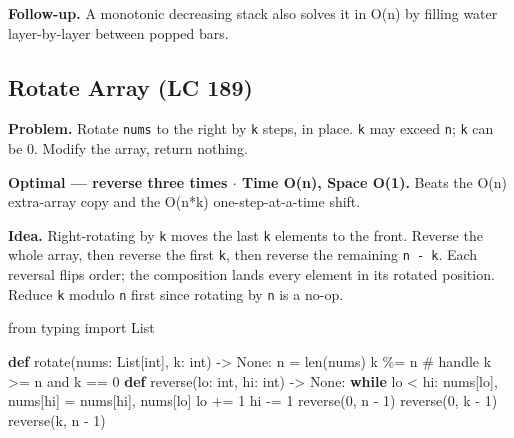 \documentclass[11pt]{article}
\newenvironment{Shaded}{\begin{snugshade}}{\end{snugshade}}
\newcommand{\BuiltInTok}[1]{\textcolor[rgb]{0.50,0.55,0.55}{#1}}
\newcommand{\CommentTok}[1]{\textcolor[rgb]{0.48,0.49,0.49}{#1}}
\newcommand{\ControlFlowTok}[1]{\textcolor[rgb]{0.99,0.74,0.29}{\textbf{#1}}}
\newcommand{\DecValTok}[1]{\textcolor[rgb]{0.96,0.45,0.00}{#1}}
\newcommand{\ImportTok}[1]{\textcolor[rgb]{0.15,0.68,0.38}{#1}}
\newcommand{\KeywordTok}[1]{\textcolor[rgb]{0.81,0.81,0.76}{\textbf{#1}}}
\newcommand{\NormalTok}[1]{\textcolor[rgb]{0.81,0.81,0.76}{#1}}
\newcommand{\OperatorTok}[1]{\textcolor[rgb]{0.81,0.81,0.76}{#1}}
\newcommand{\VariableTok}[1]{\textcolor[rgb]{0.15,0.68,0.68}{#1}}
\begin{document}
\textbf{Follow-up.} A monotonic decreasing stack also solves it in O(n) by filling water layer-by-layer between popped bars.

\subsection{Rotate Array (LC 189)}\label{rotate-array-lc-189}

\textbf{Problem.} Rotate \texttt{nums} to the right by \texttt{k} steps, in place. \texttt{k} may exceed \texttt{n}; \texttt{k} can be 0. Modify the array, return nothing.

\textbf{Optimal --- reverse three times \(\cdot\) Time O(n), Space O(1).} Beats the O(n) extra-array copy and the O(n*k) one-step-at-a-time shift.

\textbf{Idea.} Right-rotating by \texttt{k} moves the last \texttt{k} elements to the front. Reverse the whole array, then reverse the first \texttt{k}, then reverse the remaining \texttt{n\ -\ k}. Each reversal flips order; the composition lands every element in its rotated position. Reduce \texttt{k} modulo \texttt{n} first since rotating by \texttt{n} is a no-op.


\begin{Shaded}
\begin{Highlighting}[]
\ImportTok{from}\NormalTok{ typing }\ImportTok{import}\NormalTok{ List}

\KeywordTok{def}\NormalTok{ rotate(nums: List[}\BuiltInTok{int}\NormalTok{], k: }\BuiltInTok{int}\NormalTok{) }\OperatorTok{{-}\textgreater{}} \VariableTok{None}\NormalTok{:}
\NormalTok{    n }\OperatorTok{=} \BuiltInTok{len}\NormalTok{(nums)}
\NormalTok{    k }\OperatorTok{\%=}\NormalTok{ n                         }\CommentTok{\# handle k \textgreater{}= n and k == 0}
    \KeywordTok{def}\NormalTok{ reverse(lo: }\BuiltInTok{int}\NormalTok{, hi: }\BuiltInTok{int}\NormalTok{) }\OperatorTok{{-}\textgreater{}} \VariableTok{None}\NormalTok{:}
        \ControlFlowTok{while}\NormalTok{ lo }\OperatorTok{\textless{}}\NormalTok{ hi:}
\NormalTok{            nums[lo], nums[hi] }\OperatorTok{=}\NormalTok{ nums[hi], nums[lo]}
\NormalTok{            lo }\OperatorTok{+=} \DecValTok{1}
\NormalTok{            hi }\OperatorTok{{-}=} \DecValTok{1}
\NormalTok{    reverse(}\DecValTok{0}\NormalTok{, n }\OperatorTok{{-}} \DecValTok{1}\NormalTok{)}
\NormalTok{    reverse(}\DecValTok{0}\NormalTok{, k }\OperatorTok{{-}} \DecValTok{1}\NormalTok{)}
\NormalTok{    reverse(k, n }\OperatorTok{{-}} \DecValTok{1}\NormalTok{)}
\end{Highlighting}
\end{Shaded}
\end{document}
